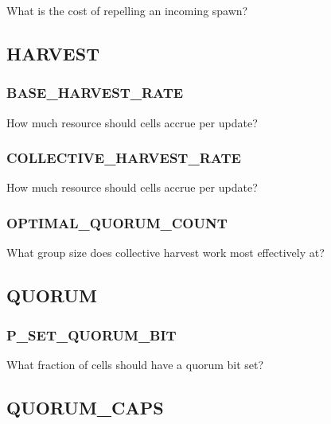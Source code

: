 
What is the cost of repelling an incoming spawn?


\subsection{HARVEST}


\subsubsection{BASE\_HARVEST\_RATE}


How much resource should cells accrue per update?

\subsubsection{COLLECTIVE\_HARVEST\_RATE}


How much resource should cells accrue per update?

\subsubsection{OPTIMAL\_QUORUM\_COUNT}


What group size does collective harvest work most effectively at?


\subsection{QUORUM}


\subsubsection{P\_SET\_QUORUM\_BIT}


What fraction of cells should have a quorum bit set?


\subsection{QUORUM\_CAPS}

